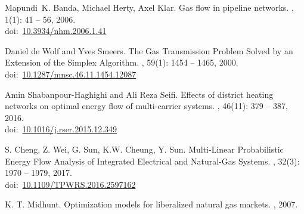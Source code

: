 \documentclass[12pt,a4paper,oneside]{book}
\newcommand{\doi}[1]{doi:~\href{https://doi.org/#1}{#1}}
\begin{document}
\begin{thebibliography}{99}
	Mapundi~K. Banda, Michael Herty, Axel Klar.
	\newblock Gas flow in pipeline networks.
	, 1(1): 41 -- 56, 2006.\\
	\doi{10.3934/nhm.2006.1.41} 
	
	Daniel de Wolf and Yves Smeers.
	\newblock The Gas Transmission Problem Solved by an Extension of the Simplex Algorithm.
	, 59(1): 1454 -- 1465, 2000.\\
	\doi{10.1287/mnsc.46.11.1454.12087}
	
	Amin Shabanpour-Haghighi and Ali Reza Seifi.
	\newblock Effects of district heating networks on optimal energy flow of multi-carrier systems.
	, 46(11): 379 -- 387, 2016.\\
	\doi{10.1016/j.rser.2015.12.349}
		
	S. Cheng, Z. Wei, G. Sun, K.W. Cheung, Y. Sun.
	\newblock Multi-Linear Probabilistic Energy Flow Analysis of Integrated Electrical and Natural-Gas Systems.
	, 32(3): 1970 -- 1979, 2017.\\
	\doi{10.1109/TPWRS.2016.2597162}
	
	K. T. Midhunt.
	\newblock Optimization models for liberalized natural gas markets.
	, 2007.	
	
    \end{thebibliography}	
\end{document}
